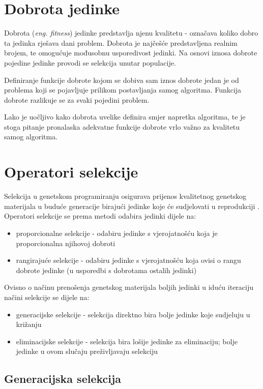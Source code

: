 \section{Dobrota jedinke}

Dobrota (\textit{eng. fitness}) jedinke predstavlja njenu kvalitetu - označava koliko dobro ta jedinka rješava dani problem. Dobrota je najčešće predstavljena realnim brojem, te omogućuje mođusobnu usporedivost jedinki. Na osnovi iznosa dobrote pojedine jedinke provodi se selekcija unutar populacije.

Definiranje funkcije dobrote kojom se dobiva sam iznos dobrote jedan je od problema koji se pojavljuje prilikom postavljanja samog algoritma. Funkcija dobrote razlikuje se za svaki pojedini problem.

 Lako je uočljivo kako dobrota uvelike definira smjer napretka algoritma, te je stoga pitanje pronalaska adekvatne funkcije dobrote vrlo važno za kvalitetu samog algoritma. 

\section{Operatori selekcije}
Selekcija u genetskom programiranju osigurava prijenos kvalitetnog genetskog materijala u buduće generacije birajući jedinke koje će sudjelovati u reprodukciji  \cite{nenr}. Operatori selekcije se prema metodi odabira jedinki dijele na:

\begin{itemize}
\item proporcionalne selekcije - odabiru jedinke s vjerojatnošću koja je proporcionalna njihovoj dobroti
\item rangirajuće selekcije - odabiru jedinke s vjerojatnošću koja ovisi o rangu  dobrote jedinke (u usporedbi s dobrotama ostalih jedinki)
\end{itemize}

Ovisno o načinu prenošenja genetskog materijala boljih jedinki u iduću iteraciju načini selekcije se dijele na:

\begin{itemize}
	\item generacijske selekcije - selekcija direktno bira bolje jedinke koje sudjeluju u križanju
	\item eliminacijske selekcije - selekcija bira lošije jedinke za eliminaciju; bolje jedinke 				u ovom slučaju preživljavaju selekciju
\end{itemize}

\subsection{Generacijska selekcija}

